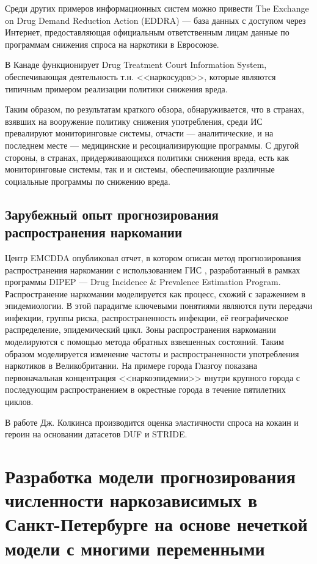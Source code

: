 \documentclass[a4paper,14pt]{article}
\begin{document}
Среди других примеров информационных систем можно привести The Exchange on Drug 
Demand Reduction Action (EDDRA) --- база данных с доступом через Интернет, 
предоставляющая официальным ответственным лицам данные по программам снижения 
спроса на наркотики в Евросоюзе.

В Канаде функционирует Drug Treatment Court Information System, обеспечивающая 
деятельность т.н. <<наркосудов>>, которые являются типичным примером реализации 
политики снижения вреда.

Таким образом, по результатам краткого обзора, обнаруживается, что в странах, 
взявших на вооружение политику снижения употребления, среди ИС превалируют 
мониторинговые системы, отчасти --- аналитические, и на последнем месте --- 
медицинские и ресоциализирующие программы.
С другой стороны, в странах, придерживающихся политики снижения вреда, есть как 
мониторинговые системы, так и и системы, обеспечивающие различные социальные 
программы по снижению вреда.

\subsection{Зарубежный опыт прогнозирования распространения наркомании}

Центр EMCDDA опубликовал отчет, в котором описан метод прогнозирования
распространения наркомании с использованием ГИС \cite{Wiessing1999},
разработанный в рамках программы DIPEP --- Drug Incidence \& Prevalence
Estimation Program. Распространение наркомании моделируется как процесс, схожий
с заражением в эпидемиологии. В этой парадигме ключевыми понятиями являются пути
передачи инфекции, группы риска, распространенность инфекции, её географическое
распределение, эпидемический цикл. Зоны распространения наркомании моделируются
с помощью метода обратных взвешенных состояний. Таким образом моделируется
изменение частоты и распространенности употребления наркотиков в Великобритании.
На примере города Глазгоу показана первоначальная концентрация <<наркоэпидемии>>
внутри крупного города с последующим распространением в окрестные города в течение
пятилетних циклов. 

В работе Дж. Колкинса \cite{Caulkins1995} производится оценка эластичности спроса 
на кокаин и героин на основании датасетов DUF и STRIDE.


\section{Разработка модели прогнозирования численности наркозависимых в 
    Санкт-Петербурге на основе нечеткой модели с многими переменными}
\end{document}
